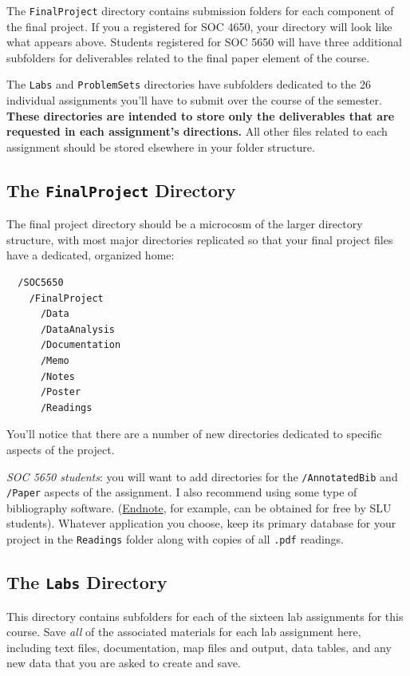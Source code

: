 \documentclass[]{book}
\theoremstyle{definition}
\theoremstyle{definition}
\theoremstyle{definition}
\theoremstyle{remark}
\begin{document}
The \texttt{FinalProject} directory contains submission folders for each
component of the final project. If you a registered for SOC 4650, your
directory will look like what appears above. Students registered for SOC
5650 will have three additional subfolders for deliverables related to
the final paper element of the course.

The \texttt{Labs} and \texttt{ProblemSets} directories have subfolders
dedicated to the 26 individual assignments you'll have to submit over
the course of the semester. \textbf{These directories are intended to
store only the deliverables that are requested in each assignment's
directions.} All other files related to each assignment should be stored
elsewhere in your folder structure.

\subsection{\texorpdfstring{The \texttt{FinalProject}
Directory}{The FinalProject Directory}}\label{the-finalproject-directory}

The final project directory should be a microcosm of the larger
directory structure, with most major directories replicated so that your
final project files have a dedicated, organized home:

\begin{verbatim}
  /SOC5650
    /FinalProject
      /Data
      /DataAnalysis
      /Documentation
      /Memo
      /Notes
      /Poster
      /Readings
\end{verbatim}

You'll notice that there are a number of new directories dedicated to
specific aspects of the project.

\emph{SOC 5650 students}: you will want to add directories for the
\texttt{/AnnotatedBib} and \texttt{/Paper} aspects of the assignment. I
also recommend using some type of bibliography software.
(\href{http://endnote.com}{Endnote}, for example, can be obtained for
free by SLU students). Whatever application you choose, keep its primary
database for your project in the \texttt{Readings} folder along with
copies of all \texttt{.pdf} readings.

\subsection{\texorpdfstring{The \texttt{Labs}
Directory}{The Labs Directory}}\label{the-labs-directory}

This directory contains subfolders for each of the sixteen lab
assignments for this course. Save \emph{all} of the associated materials
for each lab assignment here, including text files, documentation, map
files and output, data tables, and any new data that you are asked to
create and save.
\end{document}
